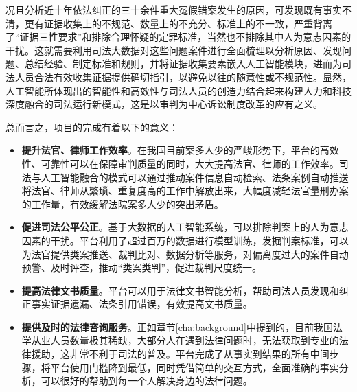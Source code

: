 况且分析近十年依法纠正的三十余件重大冤假错案发生的原因，可发现既有事实不清，更有证据收集上的不规范、数量上的不充分、标准上的不一致，严重背离了“证据三性要求”和排除合理怀疑的定罪标准，当然也不排除其中人为意志因素的干扰。这就需要利用司法大数据对这些问题案件进行全面梳理以分析原因、发现问题、总结经验、制定标准和规则，并将证据收集要素嵌入人工智能模块，进而为司法人员合法有效收集证据提供确切指引，以避免以往的随意性或不规范性。显然，人工智能所体现出的智能性和高效性与司法人员的创造力结合起来构建人力和科技深度融合的司法运行新模式，这是以审判为中心诉讼制度改革的应有之义。

总而言之，项目的完成有着以下的意义：
\begin{itemize}
	\item \textbf{提升法官、律师工作效率}。在我国目前案多人少的严峻形势下，平台的高效性、可靠性可以在保障审判质量的同时，大大提高法官、律师的工作效率。司法与人工智能融合的模式可以通过推动案件信息自动检索、法条案例自动推送将法官、律师从繁琐、重复度高的工作中解放出来，大幅度减轻法官量刑办案的工作量，有效缓解法院案多人少的突出矛盾。
	\item \textbf{促进司法公平公正}。基于大数据的人工智能系统，可以排除判案上的人为意志因素的干扰。平台利用了超过百万的数据进行模型训练，发掘判案标准，可以为法官提供类案推送、裁判比对、数据分析等服务，对偏离度过大的案件自动预警、及时评查，推动“类案类判”，促进裁判尺度统一。
	\item \textbf{提高法律文书质量}。平台可以用于法律文书智能分析，帮助司法人员发现和纠正事实证据遗漏、法条引用错误，有效提高文书质量。
	\item \textbf{提供及时的法律咨询服务}。正如章节\ref{cha:background}中提到的，目前我国法学从业人员数量极其稀缺，大部分人在遇到法律问题时，无法获取到专业的法律援助，这非常不利于司法的普及。平台完成了从事实到结果的所有中间步骤，将平台使用门槛降到最低，同时凭借简单的交互方式，全面准确的事实分析，可以很好的帮助到每一个人解决身边的法律问题。
\end{itemize}

\iffalse
\begin{itemize}
	\item 在专业人员数量受限制的情况下，平台可以在保障审判质量的同时，利用人工智能算法来大大提升审判工作的效率。
	\item 排除人为意志因素对审判结果的干扰，利用司法大数据对判案制定统一的标准。
	\item 成为每一个人的法律咨询助手，平台提供了详细、全面的案件案情分析，能够很好地为每一个人提供法律知识，帮助大家维护自身权益。
	\item 提供了人工智能与司法人员结合的判案新模式，这将是未来的发展新模式。
\end{itemize}
\fi



